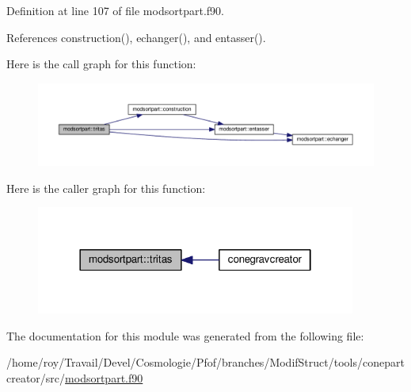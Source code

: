Definition at line 107 of file modsortpart.\-f90.



References construction(), echanger(), and entasser().



Here is the call graph for this function\-:\nopagebreak
\begin{figure}[H]
\begin{center}
\leavevmode
\includegraphics[width=350pt]{classmodsortpart_a1a6a9f53783f2139141e9064f49d2f1b_cgraph}
\end{center}
\end{figure}




Here is the caller graph for this function\-:\nopagebreak
\begin{figure}[H]
\begin{center}
\leavevmode
\includegraphics[width=298pt]{classmodsortpart_a1a6a9f53783f2139141e9064f49d2f1b_icgraph}
\end{center}
\end{figure}




The documentation for this module was generated from the following file\-:\begin{DoxyCompactItemize}
\item 
/home/roy/\-Travail/\-Devel/\-Cosmologie/\-Pfof/branches/\-Modif\-Struct/tools/conepartcreator/src/\hyperlink{conepartcreator_2src_2modsortpart_8f90}{modsortpart.\-f90}\end{DoxyCompactItemize}
